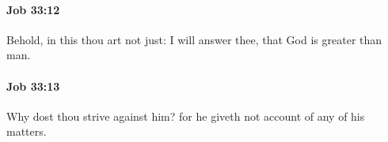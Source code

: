 		\paragraph{Job 33:12} %
			\label{JOB-33-12}

			Behold, in this thou art not just: I will answer thee, that God is greater than man.


		\paragraph{Job 33:13} %
			\label{JOB-33-13}

			Why dost thou strive against him? for he giveth not account of any of his matters.


